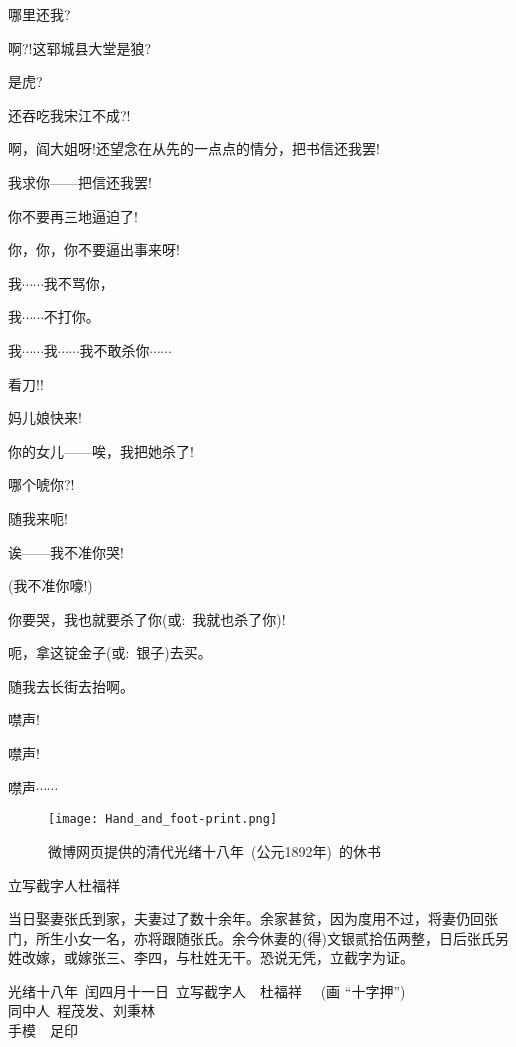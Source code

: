 {{哪里还我?}

{啊?!这郓城县大堂是狼?}

{是虎?}

{还吞吃我宋江不成?!}

{啊，阎大姐呀!还望念在从先的一点点的情分，把书信还我罢!}

{我求你------把信还我罢!}

{你不要再三地逼迫了!}

{你，你，你不要逼出事来呀!}

{我$\cdots{}\cdots{}$我不骂你，}

{我$\cdots{}\cdots{}$不打你。}

{我$\cdots{}\cdots{}$我$\cdots{}\cdots{}$我不敢杀你$\cdots{}\cdots{}$}

{看刀!!}

{妈儿娘快来!}

{你的女儿------唉，我把她杀了!}

{哪个唬你?!}

{随我来呃!}

{诶------我不准你哭!}

{(我不准你嚎!)}

{你要哭，我也就要杀了你({\akai 或}:~我就也杀了你)!}

{呃，拿这锭金子({\akai 或}:~银子)去买。}

{随我去长街去抬啊。}

{噤声!}

{噤声!}

{噤声$\cdots{}\cdots{}$}

}
\vskip 15pt 
{}

\begin{figure}[h!]
\centering
\texttt{[image: Hand\_and\_foot-print.png]}
\caption*{\hei 微博网页提供的清代光绪十八年~(公元1892年)~的休书} 
\label{Collect_Liu_Wu} 
\end{figure}

\vskip 5pt

立写截字人杜福祥

当日娶妻张氏到家，夫妻过了数十余年。余家甚贫，因为度用不过，将妻仍回张门，所生小女一名，亦将跟随张氏。余今休妻的(得)文银贰拾伍两整，日后张氏另姓改嫁，或嫁张三、李四，与杜姓无干。恐说无凭，立截字为证。

\begin{flushright}
光绪十八年~闰四月十一日~立写截字人~~杜福祥 ~~(画 ``十字押'') ~~~\\
\large{同中人~程茂发、刘秉林} ~~~~~~~~~~ \\
\huge{手模}~~\huge{足印} ~~~~~~~
\end{flushright}
